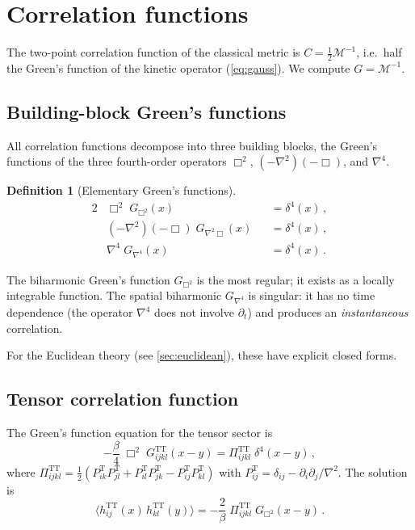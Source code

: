 \documentclass[11pt,a4paper]{article}
\newcommand{\TT}{\mathrm{TT}}
\theoremstyle{definition}
\newtheorem{definition}{Definition}
\theoremstyle{remark}
\begin{document}
\section{Correlation functions}
\label{sec:greens}

The two-point correlation function of the classical metric is
$C = \frac{1}{2}\mathcal{M}^{-1}$,
i.e.\ half the Green's function of the kinetic operator
(\cref{eq:gauss}).  We compute $G = \mathcal{M}^{-1}$.

\subsection{Building-block Green's functions}
\label{sec:building}

All correlation functions decompose into three building blocks, the
Green's functions of the three fourth-order operators
$\Box^2$, $(-\nabla^2)(-\Box)$, and $\nabla^4$.

\begin{definition}[Elementary Green's functions]\label{def:greens}
\begin{alignat}{2}
  &\Box^2\; G_{\Box^2}(x)
  &&= \delta^4(x)\,,
  \label{eq:G-box2}\\[4pt]
  &(-\nabla^2)(-\Box)\; G_{\nabla^2\Box}(x)
  &&= \delta^4(x)\,,
  \label{eq:G-mix}\\[4pt]
  &\nabla^4\; G_{\nabla^4}(x)
  &&= \delta^4(x)\,.
  \label{eq:G-lap4}
\end{alignat}
\end{definition}

The biharmonic Green's function $G_{\Box^2}$ is the most regular;
it exists as a locally integrable function.  The spatial biharmonic
$G_{\nabla^4}$ is singular: it has no time dependence (the operator
$\nabla^4$ does not involve $\partial_t$) and produces an
\emph{instantaneous} correlation.

For the Euclidean theory (see \cref{sec:euclidean}), these have
explicit closed forms.

\subsection{Tensor correlation function}

The Green's function equation for the tensor sector is
\begin{equation}
  -\frac{\beta}{4}\;\Box^2\;
  G^\TT_{ijkl}(x-y) = \Pi^\TT_{ijkl}\;\delta^4(x-y)\,,
\end{equation}
where $\Pi^\TT_{ijkl} = \frac{1}{2}(P^\mathrm{T}_{ik}P^\mathrm{T}_{jl}
+ P^\mathrm{T}_{il}P^\mathrm{T}_{jk} - P^\mathrm{T}_{ij}P^\mathrm{T}_{kl})$
with $P^\mathrm{T}_{ij} = \delta_{ij} - \partial_i\partial_j/\nabla^2$.
The solution is
\begin{equation}\label{eq:corr-TT}
  \boxed{
  \bigl\langle h^\TT_{ij}(x)\, h^\TT_{kl}(y)\bigr\rangle
  = -\frac{2}{\beta}\;
    \Pi^\TT_{ijkl}\; G_{\Box^2}(x-y)\,.}
\end{equation}
\end{document}
